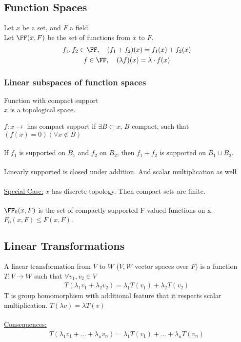 \documentclass[class=scrartcl, crop=false]{standalone}
\begin{document}
\subsection{Function Spaces}

Let $x$ be a set, and $F$ a field.
\\
Let $\FF(x, F)$ be the set of functions from $x$ to $F$.
\begin{gather*}
  f_1, f_2 \in \FF, \quad (f_1 + f_2)(x) = f_1(x) + f_2(x) \\
  f \in \FF, \quad (\lambda f)(x) = \lambda \cdot f(x)
\end{gather*} 

\subsubsection{Linear subspaces of function spaces}

\begin{enumerate}
  \ii
  Function with compact support
  \\
  $x$ is a topological space.
  \begin{definition}
    $f: x \to $ has compact support if $\exists B \subset x$, $B$ compact, such that $(f(x) = 0) (\forall x \notin B)$ 
    \\\\
    If $f_1$ is supported on $B_1$ and $f_2$ on $B_2$, then $f_1 + f_2$ is supported on $B_1 \cup B_2$.
    \\\\
    Linearly supported is closed under addition. And scalar multiplication as well
    \\\\
    \ul{Special Case:} $x$ has discrete topology. Then compact sets are finite.
    \\\\
    $\FF_0(x, F)$ is the set of compactly supported F-valued functions on x.  $F_0(x, F) \leq F(x, F)$.
  \end{definition} 
\end{enumerate} 

\subsection{Linear Transformations}

\begin{definition}
  A linear transformation from $V$ to $W$ ($V, W$ vector spaces over $F$) is a function $T: V \to W$ such that $\forall v_1, v_2 \in V$ 
    \begin{gather*}
      T(\lambda_1v_1 + \lambda_2v_2) = \lambda_1T(v_1) + \lambda_2T(v_2)
    \end{gather*} 
    T is group homomorphism with additional feature that it respects scalar multiplication. $T(\lambda v) = \lambda T(v)$
    \\\\
    \ul{Consequences:}
    \begin{gather*}
      T(\lambda_1v_1 + \dots + \lambda_nv_n) = \lambda_1T(v_1) + \dots + \lambda_nT(v_n)
    \end{gather*} 
\end{definition} 
\end{document}
